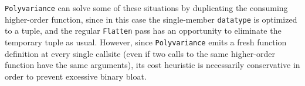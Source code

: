 \texttt{Polyvariance} can solve some of these situations by duplicating the
consuming higher-order function, since in this case the single-member
\texttt{datatype} is optimized to a tuple, and the regular \texttt{Flatten} pass
has an opportunity to eliminate the temporary tuple as usual. However, since
\texttt{Polyvariance} emits a fresh function definition at every single callsite
(even if two calls to the same higher-order function have the same arguments),
its cost heuristic is necessarily conservative in order to prevent excessive
binary bloat.

















